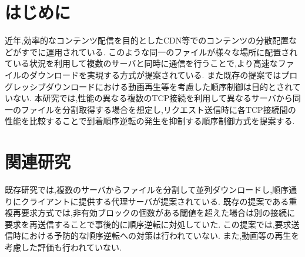 \documentclass{ltjsarticle}
\begin{document}
 
\vspace{-5mm}
\section{はじめに}
\vspace{-2mm}
近年,効率的なコンテンツ配信を目的としたCDN等でのコンテンツの分散配置などがすでに運用されている.
このような同一のファイルが様々な場所に配置されている状況を利用して複数のサーバと同時に通信を行うことで,より高速なファイルのダウンロードを実現する方式が提案されている\cite{mhttp}\cite{proxy}.
また既存の提案ではプログレッシブダウンロードにおける動画再生等を考慮した順序制御は目的とされていない.
本研究では,性能の異なる複数のTCP接続を利用して異なるサーバから同一のファイルを分割取得する場合を想定し,リクエスト送信時に各TCP接続間の性能を比較することで到着順序逆転の発生を抑制する順序制御方式を提案する.
\vspace{-8mm}

\section{関連研究}
\vspace{-2mm}
既存研究では,複数のサーバからファイルを分割して並列ダウンロードし,順序通りにクライアントに提供する代理サーバが提案されている\cite{proxy}.
既存の提案である重複再要求方式では,非有効ブロックの個数がある閾値を超えた場合は別の接続に要求を再送信することで事後的に順序逆転に対処していた.
この提案では,要求送信時における予防的な順序逆転への対策は行われていない.
また,動画等の再生を考慮した評価も行われていない.
\vspace{-8mm}
\end{document}
